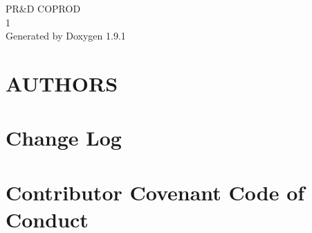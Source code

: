 \let\mypdfximage\pdfximage\def\pdfximage{\immediate\mypdfximage}\documentclass[twoside]{book}
\newcommand{\+}{\discretionary{\mbox{\scriptsize$\hookleftarrow$}}{}{}}
\newcommand{\clearemptydoublepage}{%
  \newpage{\pagestyle{empty}\cleardoublepage}%
}
\begin{document}
\raggedbottom

\hypersetup{pageanchor=false,
             bookmarksnumbered=true,
             pdfencoding=unicode
            }
\begin{titlepage}
\vspace*{7cm}
\begin{center}%
{\Large PR\&D COPROD \\[1ex]\large 1 }\\
\vspace*{1cm}
{\large Generated by Doxygen 1.9.1}\\
\end{center}
\end{titlepage}
\clearemptydoublepage
{}
\tableofcontents
\clearemptydoublepage
{}
\hypersetup{pageanchor=true}

\chapter{AUTHORS}
\label{md__c___users_nouet__documents__cours_5_a__dev__p_r_d__prd_coprod__prd_coprod_libs_xlnt_1_5_0__a_u_t_h_o_r_s}

\chapter{Change Log}
\label{md__c___users_nouet__documents__cours_5_a__dev__p_r_d__prd_coprod__prd_coprod_libs_xlnt_1_5_0__c_h_a_n_g_e_l_o_g}

\chapter{Contributor Covenant Code of Conduct}
\label{md__c___users_nouet__documents__cours_5_a__dev__p_r_d__prd_coprod__prd_coprod_libs_xlnt_1_5_0__c_o_d_e__o_f__c_o_n_d_u_c_t}

\end{document}

